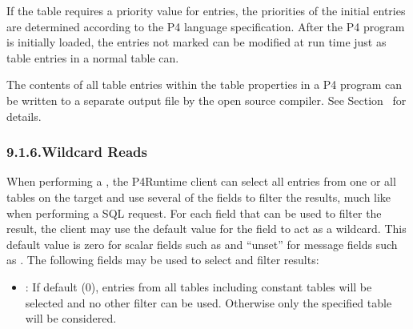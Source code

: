 \documentclass[11pt]{article}
\begin{document}
{%
If the table requires a priority value for entries, the priorities of
the initial entries are determined according to the P4 language
specification.  After the P4 program is initially loaded, the entries
not marked  can be modified at run time just as table entries
in a normal table can.%

The contents of all table entries within the  table
properties in a P4 program can be written to a separate output file by
the open source  compiler.  See Section~ for
details.%

\subsubsection{9.1.6.\hspace*{0.5em}Wildcard Reads}\label{sec-table-wildcard-reads}%

\noindent{}When performing a , the P4Runtime client can select all entries
from one or all tables on the target and use several of the  fields
to filter the results, much like when performing a SQL request. For each field
that can be used to filter the result, the client may use the default value for
the field to act as a wildcard. This default value is zero for scalar fields
such as  and \textquotedblleft{}unset\textquotedblright{} for message fields such as . The following
fields may be used to select and filter results:%

\begin{itemize}[noitemsep,topsep=\mdcompacttopsep]%

\item{}: If default (0), entries from all tables \textemdash{} including constant
tables \textemdash{} will be selected and no other filter can be used. Otherwise only
the specified table will be considered.%


\end{itemize}}
\end{document}
